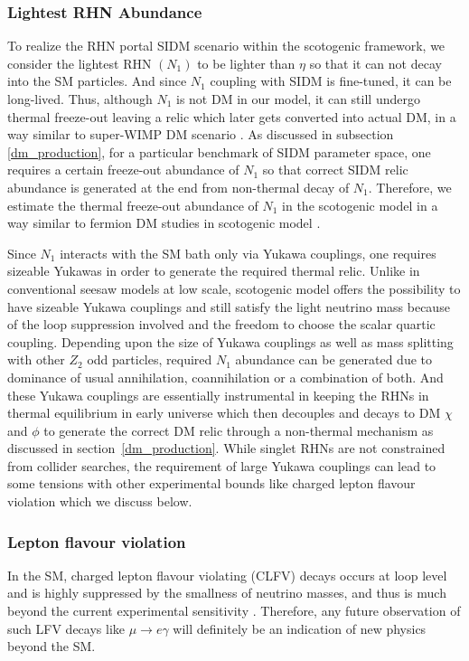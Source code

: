 \documentclass[prd,nofootinbib,preprint,superscriptaddress]{revtex4}
\begin{document}
\subsubsection{Lightest RHN Abundance}
To realize the RHN portal SIDM scenario within the scotogenic framework, we consider the lightest RHN $(N_1)$ to be lighter than $\eta$ so that it can not decay into the SM particles. And since $N_1$ coupling with SIDM is fine-tuned, it can be long-lived. Thus, although $N_1$ is not DM in our model, it can still undergo thermal freeze-out leaving a relic which later gets converted into actual DM, in a way similar to super-WIMP DM scenario \cite{Feng:2003uy}. As discussed in subsection \ref{dm_production}, for a particular benchmark of SIDM parameter space, one requires a certain freeze-out abundance of $N_1$ so that correct SIDM relic abundance is generated at the end from non-thermal decay of $N_1$. Therefore, we estimate the thermal freeze-out abundance of $N_1$ in the scotogenic model in a way similar to fermion DM studies in scotogenic model \cite{Ahriche:2017iar, Mahanta:2019gfe, Borah:2020wut}. 


Since $N_1$ interacts with the SM bath only via Yukawa couplings, one requires sizeable Yukawas in order to generate the required thermal relic. Unlike in conventional seesaw models at low scale, scotogenic model offers the possibility to have sizeable Yukawa couplings and still satisfy the light neutrino mass because of the loop suppression involved and the freedom to choose the scalar quartic coupling. Depending upon the size of Yukawa couplings as well as mass splitting with other $Z_2$ odd particles, required $N_1$ abundance can be generated due to dominance of usual annihilation, coannihilation \cite{Griest:1990kh} or a combination of both. And these Yukawa couplings are essentially instrumental in keeping the RHNs in thermal equilibrium in early universe which then decouples and decays to DM $\chi$ and $\phi$ to generate the correct DM relic through a non-thermal mechanism as discussed in section~\ref{dm_production}. While singlet RHNs are not constrained from collider searches, the requirement of large Yukawa couplings can lead to some tensions with other experimental bounds like charged lepton flavour violation which we discuss below.


\subsubsection{Lepton flavour violation}
\label{lfv}
In the SM, charged lepton flavour violating (CLFV) decays occurs at loop level and is highly suppressed by the smallness of neutrino masses, and thus is much beyond the current experimental sensitivity \cite{TheMEG:2016wtm}. Therefore, any future observation of such LFV decays like $\mu \rightarrow e \gamma$ will definitely be an indication of new physics beyond the SM. 
\end{document}
